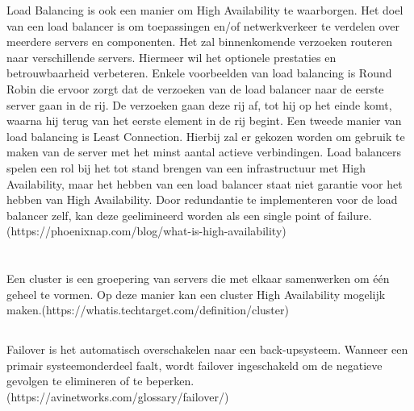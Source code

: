 Load Balancing is ook een manier om High Availability te waarborgen. Het doel van een load balancer is om toepassingen en/of netwerkverkeer te verdelen over meerdere servers en componenten. Het zal binnenkomende verzoeken routeren naar verschillende servers. Hiermeer wil het optionele prestaties en betrouwbaarheid verbeteren. Enkele voorbeelden van load balancing is Round Robin die ervoor zorgt dat de verzoeken van de load balancer naar de eerste server gaan in de rij. De verzoeken gaan deze rij af, tot hij op het einde komt, waarna hij terug van het eerste element in de rij begint. Een tweede manier van load balancing is Least Connection. Hierbij zal er gekozen worden om gebruik te maken van de server met het minst aantal actieve verbindingen. Load balancers spelen een rol bij het tot stand brengen van een infrastructuur met High Availability, maar het hebben van een load balancer staat niet garantie voor het hebben van High Availability. Door redundantie te implementeren voor de load balancer zelf, kan deze geelimineerd worden als een single point of failure.
(https://phoenixnap.com/blog/what-is-high-availability)



\section{}
\label{sec:Cluster solutions}

\subsection{}
\label{subsec:Cluster}

Een cluster is een groepering van servers die met elkaar samenwerken om één geheel te vormen. Op deze manier kan een cluster High Availability mogelijk maken.(https://whatis.techtarget.com/definition/cluster)

\subsection{}
\label{subsec:Failover}

Failover is het automatisch overschakelen naar een back-upsysteem. Wanneer een primair systeemonderdeel faalt, wordt failover ingeschakeld om de negatieve gevolgen te elimineren of te beperken. (https://avinetworks.com/glossary/failover/)

